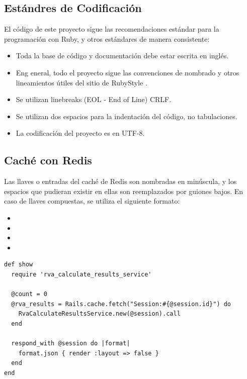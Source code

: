 \subsection{Estándres de Codificación}
El código de este proyecto sigue las recomendaciones estándar para la programación con Ruby, y otros estándares de manera consistente:
\begin{itemize}
  \item Toda la base de código y documentación debe estar escrita en inglés.
  \item Eng eneral, todo el proyecto sigue las convenciones de nombrado y otros lineamientos útiles del sitio de RubyStyle \cite{rubystyle}.
  \item Se utilizan linebreaks (EOL - End of Line) CRLF.
  \item Se utilizan dos espacios para la indentación del código, no tabulaciones.
  \item La codificación del proyecto es en UTF-8. 
\end{itemize}

\subsection{Caché con Redis}
Las llaves o entradas del caché de Redis \cite{redis} son nombradas en minúscula, y los espacios que pudieran existir en ellas son reemplazados por guiones bajos. En caso de llaves compuestas, se utiliza el siguiente formato:

\begin{itemize}
  \item {}
  \item {}
  \item {}
  \item {}
\end{itemize}

\begin{longlisting}
  \begin{verbatim}  
def show
  require 'rva_calculate_results_service'
	
  @count = 0
  @rva_results = Rails.cache.fetch("Session:#{@session.id}") do
    RvaCalculateResultsService.new(@session).call
  end
	
  respond_with @session do |format|
    format.json { render :layout => false }
  end  
end
  \end{verbatim}
\end{longlisting}


